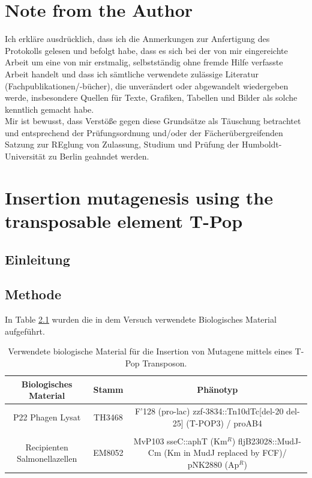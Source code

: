 \documentclass[oneside,10pt,a4paper]{report}
\begin{document}
	\chapter{Note from the Author}
	Ich erkläre ausdrücklich, dass ich die Anmerkungen zur Anfertigung des Protokolls gelesen und befolgt habe, dass es sich bei der von mir eingereichte Arbeit um eine von mir erstmalig, selbstständig ohne fremde Hilfe verfasste Arbeit handelt und dass ich sämtliche verwendete zulässige Literatur (Fachpublikationen/-bücher), die unverändert oder abgewandelt wiedergeben werde, insbesondere Quellen für Texte, Grafiken, Tabellen und Bilder als solche kenntlich gemacht habe.\\
	Mir ist bewusst, dass Verstöße gegen diese Grundsätze als Täuschung betrachtet und entsprechend der Prüfungsordnung und/oder der Fächerübergreifenden Satzung zur REglung von Zulassung, Studium und Prüfung der Humboldt-Universität zu Berlin geahndet werden.
	
	
	\chapter{Insertion mutagenesis using the transposable element T-Pop}	
	
		\section{Einleitung}
		
		\section{Methode}
		In Table \ref{tab: exp2-biologisches Material} wurden die in dem Versuch verwendete Biologisches Material aufgeführt.
		
			\begin{table}[H]
			\centering
			\caption{Verwendete biologische Material für die Insertion von Mutagene mittels eines T-Pop Transposon.}
			\label{tab: exp2-biologisches Material}
			\begin{tabular}{ccc}
				\toprule
				Biologisches Material& Stamm & Phänotyp\\
				\midrule
				\multirow{2}{*}{P22 Phagen Lysat} & \multirow{2}{*}{TH3468} & \multirow{2}{*}{\parbox[t]{9cm}{F’128 (pro-lac) zzf-3834::Tn10dTc[del-20 del-25] (T-POP3) / proAB4}}\\
				&&\\
				&&\\
				\multirow{3}{*}{\parbox[t]{3cm}{Recipienten Salmonellazellen}} & \multirow{3}{*}{EM8052} &\multirow{3}{*}{\parbox[t]{9cm}{MvP103 sseC::aphT (Km$^R$) fljB23028::MudJ-Cm (Km in MudJ replaced by FCF)/ pNK2880 (Ap$^R$)}} \\
				&&\\
				&&\\

				\bottomrule			
			\end{tabular}
		\end{table}
\end{document}
